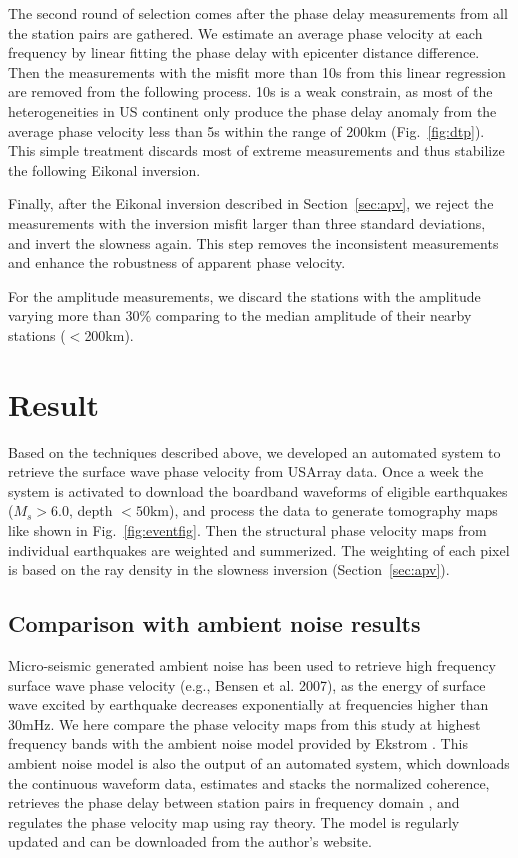 \documentclass[referee]{gji}
\begin{document}
The second round of selection comes after the phase delay measurements from all the station pairs are gathered. We estimate an average phase velocity at each frequency by linear fitting the phase delay with epicenter distance difference. Then the measurements with the misfit more than 10s from this linear regression are removed from the following process. 10s is a weak constrain, as most of the heterogeneities in US continent only produce the phase delay anomaly from the average phase velocity less than 5s within the range of 200km (Fig.~\ref{fig:dtp}). This simple treatment discards most of extreme measurements and thus stabilize the following Eikonal inversion.

Finally, after the Eikonal inversion described in Section~\ref{sec:apv}, we reject the measurements with the inversion misfit larger than three standard deviations, and invert the slowness again. This step removes the inconsistent measurements and enhance the robustness of apparent phase velocity. 

For the amplitude measurements, we discard the stations with the amplitude varying more than 30\% comparing to the median amplitude of their nearby stations ($<$200km).   


\section{Result}

Based on the techniques described above, we developed an automated system to retrieve the surface wave phase velocity from USArray data. Once a week the system is activated to download the boardband waveforms of eligible earthquakes ($M_s > 6.0$, depth $<50$km), and process the data to generate tomography maps like shown in Fig.~\ref{fig:eventfig}. Then the structural phase velocity maps from individual earthquakes are weighted and summerized. The weighting of each pixel is based on the ray density in the slowness inversion (Section~\ref{sec:apv}).

\subsection{Comparison with ambient noise results}
\label{sec:noise_comp}

Micro-seismic generated ambient noise has been used to retrieve high frequency surface wave phase velocity (e.g., Bensen et al. 2007), as the energy of surface wave excited by earthquake decreases exponentially at frequencies higher than 30mHz.  We here compare the phase velocity maps from this study at highest frequency bands with the ambient noise model provided by Ekstrom . This ambient noise model is also the output of an automated system, which downloads the continuous waveform data, estimates and stacks the normalized coherence, retrieves the phase delay between station pairs in frequency domain \cite{Ekstrom:1997mg}, and regulates the phase velocity map using ray theory. The model is regularly updated and can be downloaded from the author’s website.
\end{document}
